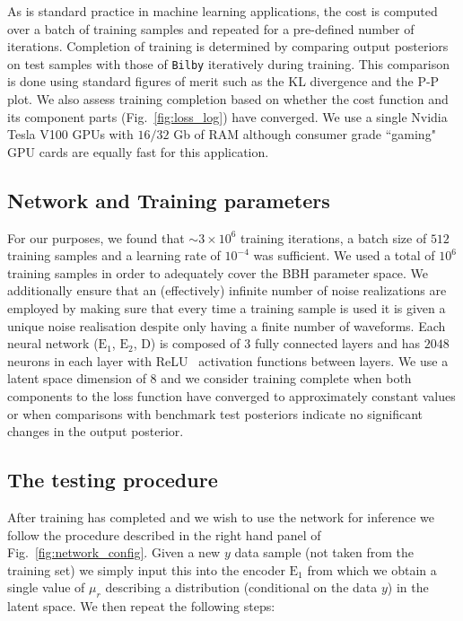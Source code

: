 %
%
As is standard practice in machine learning applications, the cost is computed
over a batch of training samples and repeated for a pre-defined number of
iterations. Completion of training is determined by comparing output posteriors
on test samples with those of \texttt{Bilby} iteratively during training. This
comparison is done using standard figures of merit such as the \ac{KL}
divergence and the P-P plot. We also assess training completion based on
whether the cost function and its component parts (Fig.~\ref{fig:loss_log})
have converged. We use a single Nvidia Tesla V100 \acp{GPU} with $16/32$ Gb of
RAM although consumer grade ``gaming" \ac{GPU} cards are equally fast for this
application.


\subsection{Network and Training parameters}
%
%
For our purposes, we found that $\sim3\times10^6$ training iterations, a batch
size of $512$ training samples and a learning rate of $10^{-4}$ was sufficient.
We used a total of $10^6$ training samples in order to adequately cover the
\ac{BBH} parameter space. We additionally ensure that an (effectively) infinite
number of noise realizations are employed by making sure that every time a
training sample is used it is given a unique noise realisation despite only
having a finite number of waveforms. Each neural network ($\text{E}_1$,
$\text{E}_2$, D) is composed of 3 fully connected layers and has $2048$ neurons
in each layer with ReLU~\cite{nair2010rectified} activation functions between
layers. We use a latent space dimension of $8$ and we consider training
complete when both components to the loss function have converged to
approximately constant values or when comparisons with benchmark test
posteriors indicate no significant changes in the output posterior.

\subsection{The testing procedure}
%
%
%
After training has completed and we wish to use the network for inference we
follow the procedure described in the right hand panel of
Fig.~\ref{fig:network_config}. Given a new $y$ data sample (not taken from the
training set) we simply input this into the encoder $\textrm{E}_1$ from which we
obtain a single value of $\mu_{r}$ describing a distribution (conditional on the
data $y$) in the latent space. We then repeat the following steps:

